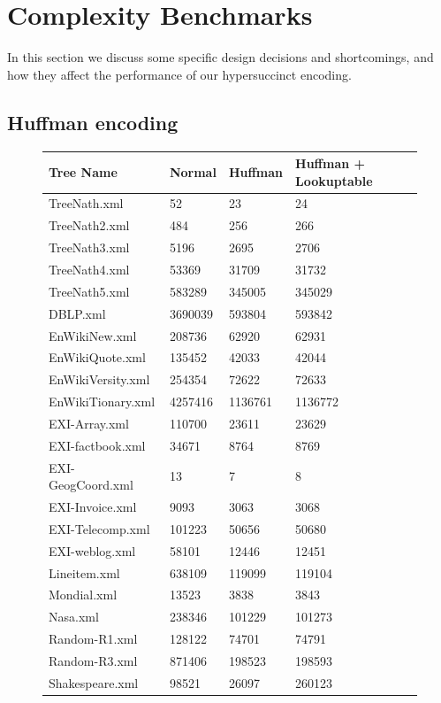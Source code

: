 \documentclass{article}
\begin{document}
\section{Complexity Benchmarks}
In this section we discuss some specific design decisions and shortcomings, and how they affect the performance of our hypersuccinct encoding.
\subsection{Huffman encoding}
\begin{figure}[h]
	\begin{tabular}{ |p{4.5cm}||p{2cm}|p{2cm}|p{4cm}|  }
		 \hline
		 Tree Name & Normal &Huffman &Huffman + Lookuptable\\
		 \hline
		 TreeNath.xml 		&52    		&23 		&24 		\\
		 TreeNath2.xml		&484  		&256   	&266 		\\
		 TreeNath3.xml		&5196 	&2695		&2706		\\
		 TreeNath4.xml		&53369	&31709	&31732	\\
		 TreeNath5.xml		&583289	&345005	&345029	\\
		 DBLP.xml			&3690039	&593804	&593842	\\
		 EnWikiNew.xml		&208736	&62920	&62931	\\
		 EnWikiQuote.xml		&135452	&42033	&42044	\\
		 EnWikiVersity.xml		&254354	&72622	&72633	\\
		 EnWikiTionary.xml		&4257416	&1136761	&1136772	\\
		 EXI-Array.xml		&110700	&23611	&23629	\\
		 EXI-factbook.xml		&34671	&8764		&8769		\\
		 EXI-GeogCoord.xml	&13		&7		&8		\\
		 EXI-Invoice.xml		&9093		&3063		&3068		\\
		 EXI-Telecomp.xml		&101223	&50656	&50680	\\
		 EXI-weblog.xml		&58101	&12446	&12451	\\
		 Lineitem.xml			&638109	&119099	&119104	\\
		 Mondial.xml			&13523	&3838		&3843		\\
		 Nasa.xml			&238346	&101229	&101273	\\
		 Random-R1.xml		&128122	&74701	&74791	\\
		 Random-R3.xml		&871406	&198523	&198593	\\
		 Shakespeare.xml		&98521	&26097	&260123	\\

\end{tabular}
\end{figure}
\end{document}
